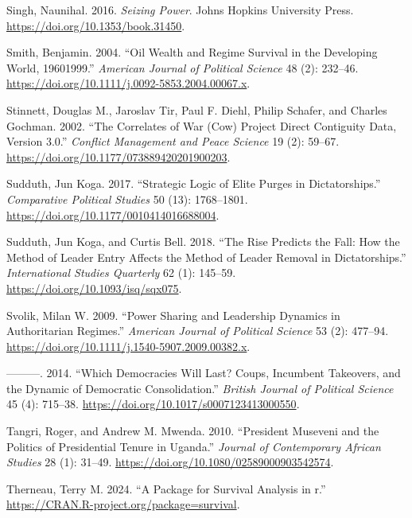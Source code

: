 \documentclass[
  12pt,
]{report}
\newlength{\cslhangindent}
\newenvironment{CSLReferences}[2] %
 {\begin{list}{}{%
  \setlength{\itemindent}{0pt}
  \setlength{\leftmargin}{0pt}
  \setlength{\parsep}{0pt}
  \ifodd #1
   \setlength{\leftmargin}{\cslhangindent}
   \setlength{\itemindent}{-1\cslhangindent}
  \fi
  \setlength{\itemsep}{#2\baselineskip}}}
 {\end{list}}
\begin{document}
\begin{CSLReferences}{1}{0}
Singh, Naunihal. 2016. \emph{Seizing Power}. Johns Hopkins University
Press. \url{https://doi.org/10.1353/book.31450}.

Smith, Benjamin. 2004. {``Oil Wealth and Regime Survival in the
Developing World, 1960{\textendash}1999.''} \emph{American Journal of
Political Science} 48 (2): 232--46.
\url{https://doi.org/10.1111/j.0092-5853.2004.00067.x}.

Stinnett, Douglas M., Jaroslav Tir, Paul F. Diehl, Philip Schafer, and
Charles Gochman. 2002. {``The Correlates of War (Cow) Project Direct
Contiguity Data, Version 3.0.''} \emph{Conflict Management and Peace
Science} 19 (2): 59--67.
\url{https://doi.org/10.1177/073889420201900203}.

Sudduth, Jun Koga. 2017. {``Strategic Logic of Elite Purges in
Dictatorships.''} \emph{Comparative Political Studies} 50 (13):
1768--1801. \url{https://doi.org/10.1177/0010414016688004}.

Sudduth, Jun Koga, and Curtis Bell. 2018. {``The Rise Predicts the Fall:
How the Method of Leader Entry Affects the Method of Leader Removal in
Dictatorships.''} \emph{International Studies Quarterly} 62 (1):
145--59. \url{https://doi.org/10.1093/isq/sqx075}.

Svolik, Milan W. 2009. {``Power Sharing and Leadership Dynamics in
Authoritarian Regimes.''} \emph{American Journal of Political Science}
53 (2): 477--94. \url{https://doi.org/10.1111/j.1540-5907.2009.00382.x}.

---------. 2014. {``Which Democracies Will Last? Coups, Incumbent
Takeovers, and the Dynamic of Democratic Consolidation.''} \emph{British
Journal of Political Science} 45 (4): 715--38.
\url{https://doi.org/10.1017/s0007123413000550}.

Tangri, Roger, and Andrew M. Mwenda. 2010. {``President Museveni and the
Politics of Presidential Tenure in Uganda.''} \emph{Journal of
Contemporary African Studies} 28 (1): 31--49.
\url{https://doi.org/10.1080/02589000903542574}.

Therneau, Terry M. 2024. {``A Package for Survival Analysis in r.''}
\url{https://CRAN.R-project.org/package=survival}.


\end{CSLReferences}
\end{document}
